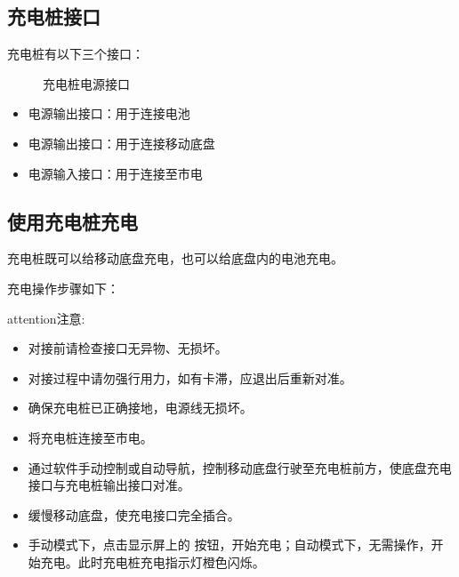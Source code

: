 \documentclass[a4paper,11pt,english,openany,oneside]{sphinxmanual}
\begin{document}
\subsection{充电桩接口}
\label{\detokenize{_u9009_u914d_u8bbe_u5907:id16}}\label{\detokenize{_u9009_u914d_u8bbe_u5907:id17}}
\sphinxAtStartPar
充电桩有以下三个接口：

\begin{figure}[H]
\centering
\capstart

\noindent{}
\caption{充电桩电源接口}\label{\detokenize{_u9009_u914d_u8bbe_u5907:id37}}\end{figure}
\begin{itemize}
\item {} 
\sphinxAtStartPar
{} 电源输出接口：用于连接电池

\item {} 
\sphinxAtStartPar
{} 电源输出接口：用于连接移动底盘

\item {} 
\sphinxAtStartPar
{} 电源输入接口：用于连接至市电

\end{itemize}


\subsection{使用充电桩充电}
\label{\detokenize{_u9009_u914d_u8bbe_u5907:id18}}\label{\detokenize{_u9009_u914d_u8bbe_u5907:id19}}
\sphinxAtStartPar
充电桩既可以给移动底盘充电，也可以给底盘内的电池充电。

\sphinxAtStartPar
{} 充电操作步骤如下：

\begin{sphinxadmonition}{attention}{注意:}\begin{itemize}
\item {} 
\sphinxAtStartPar
对接前请检查接口无异物、无损坏。

\item {} 
\sphinxAtStartPar
对接过程中请勿强行用力，如有卡滞，应退出后重新对准。

\item {} 
\sphinxAtStartPar
确保充电桩已正确接地，电源线无损坏。

\end{itemize}
\end{sphinxadmonition}
\begin{itemize}
\item {} 
\sphinxAtStartPar
将充电桩连接至市电。

\item {} 
\sphinxAtStartPar
通过软件手动控制或自动导航，控制移动底盘行驶至充电桩前方，使底盘充电接口与充电桩输出接口对准。

\item {} 
\sphinxAtStartPar
缓慢移动底盘，使充电接口完全插合。

\item {} 
\sphinxAtStartPar
手动模式下，点击显示屏上的  按钮，开始充电；自动模式下，无需操作，开始充电。此时充电桩充电指示灯橙色闪烁。

\end{itemize}
\end{document}
